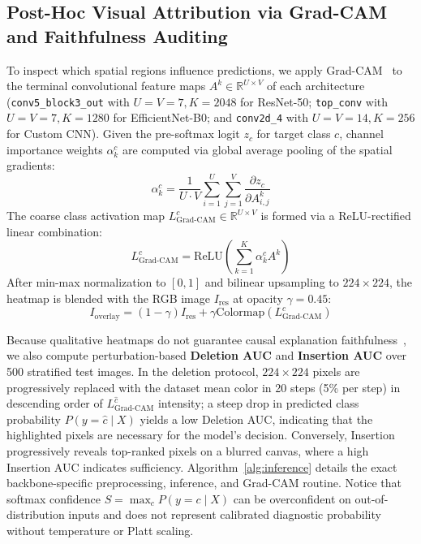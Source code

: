 \documentclass[journal]{IEEEtran}
\begin{document}
\subsection{Post-Hoc Visual Attribution via Grad-CAM and Faithfulness Auditing}
To inspect which spatial regions influence predictions, we apply Grad-CAM~\cite{selvaraju2017} to the terminal convolutional feature maps $A^k \in \mathbb{R}^{U \times V}$ of each architecture (\texttt{conv5\_block3\_out} with $U=V=7, K=2048$ for ResNet-50; \texttt{top\_conv} with $U=V=7, K=1280$ for EfficientNet-B0; and \texttt{conv2d\_4} with $U=V=14, K=256$ for Custom CNN). Given the pre-softmax logit $z_c$ for target class $c$, channel importance weights $\alpha_k^c$ are computed via global average pooling of the spatial gradients:
\begin{equation}
\alpha_k^c = \frac{1}{U \cdot V} \sum_{i=1}^{U} \sum_{j=1}^{V} \frac{\partial z_c}{\partial A_{i,j}^k}
\end{equation}
The coarse class activation map $L_{\text{Grad-CAM}}^c \in \mathbb{R}^{U \times V}$ is formed via a ReLU-rectified linear combination:
\begin{equation}
L_{\text{Grad-CAM}}^c = \text{ReLU}\left( \sum_{k=1}^{K} \alpha_k^c A^k \right)
\end{equation}
After min-max normalization to $[0, 1]$ and bilinear upsampling to $224 \times 224$, the heatmap is blended with the RGB image $I_{\text{res}}$ at opacity $\gamma = 0.45$:
\begin{equation}
I_{\text{overlay}} = (1 - \gamma) I_{\text{res}} + \gamma \text{Colormap}\left(L_{\text{Grad-CAM}}^c\right)
\end{equation}

Because qualitative heatmaps do not guarantee causal explanation faithfulness~\cite{xai2026review}, we also compute perturbation-based \textbf{Deletion AUC} and \textbf{Insertion AUC} over 500 stratified test images. In the deletion protocol, $224 \times 224$ pixels are progressively replaced with the dataset mean color in 20 steps (5\% per step) in descending order of $L_{\text{Grad-CAM}}^{\hat{c}}$ intensity; a steep drop in predicted class probability $P(y=\hat{c}\mid X)$ yields a low Deletion AUC, indicating that the highlighted pixels are necessary for the model's decision. Conversely, Insertion progressively reveals top-ranked pixels on a blurred canvas, where a high Insertion AUC indicates sufficiency. Algorithm~\ref{alg:inference} details the exact backbone-specific preprocessing, inference, and Grad-CAM routine. Notice that softmax confidence $S = \max_c P(y=c\mid X)$ can be overconfident on out-of-distribution inputs and does not represent calibrated diagnostic probability without temperature or Platt scaling.
\end{document}
